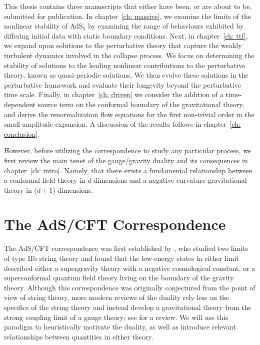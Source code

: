 \documentclass[../PhD.tex]{subfiles}
\begin{document}
This thesis contains three manuscripts that either have been, or are about to be, submitted for publication. In chapter~\ref{ch: massive}, we examine the limits of the nonlinear stability of AdS$_5$ by examining the range of behaviours exhibited by differing initial data with static boundary conditions. Next, in chapter~\ref{ch: ttf}, we expand upon solutions to the perturbative theory that capture the weakly turbulent dynamics involved in the collapse process. We focus on determining the stability of solutions to the leading nonlinear contributions to the perturbative theory, known as quasi-periodic solutions. We then evolve these solutions in the perturbative framework and evaluate their longevity beyond the perturbative time scale. Finally, in chapter~\ref{ch: driven} we consider the addition of a time-dependent source term on the conformal boundary of the gravitational theory, and derive the renormalization flow equations for the first non-trivial order in the small-amplitude expansion. A discussion of the results follows in chapter~\ref{ch: conclusion}.

However, before utilizing the correspondence to study any particular process, we first review the main tenet of the gauge/gravity duality and its consequences in chapter~\ref{ch: intro}. Namely, that there exists a fundamental relationship between a conformal field theory in $d$-dimensions and a negative-curvature gravitational theory in ($d + 1$)-dimensions.


\section{The AdS/CFT Correspondence}
\label{sec: ads/cft}

The AdS/CFT correspondence was first established by \cite{hep-th/9711200}, who studied two limits of type IIb string theory and found that the low-energy states in either limit described either a supergravity theory with a negative cosmological constant, or a superconformal quantum field theory living on the boundary of the gravity theory. Although this correspondence was originally conjectured from the point of view of string theory, more modern reviews of the duality rely less on the specifics of the string theory and instead develop a gravitational theory from the strong coupling limit of a gauge theory; see \cite{gr-qc/0602037} for a review. We will use this paradigm to heuristically motivate the duality, as well as introduce relevant relationships between quantities in either theory.  
\end{document}
